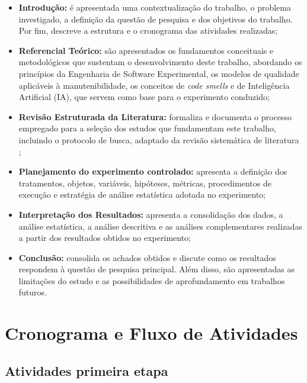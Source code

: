 \begin{itemize}[itemsep=0.4em, topsep=0.5em, parsep=0pt, partopsep=0pt]
	\item \textbf{Introdução:} é apresentada uma contextualização do trabalho, o problema investigado, a definição da questão de pesquisa e dos objetivos do trabalho. Por fim, descreve a estrutura e o cronograma das atividades realizadas;

	\item \textbf{Referencial Teórico:} são apresentados os fundamentos conceituais e metodológicos que sustentam o desenvolvimento deste trabalho, abordando os princípios da Engenharia de Software Experimental, os modelos de qualidade aplicáveis à manutenibilidade, os conceitos de \textit{code smells} e de Inteligência Artificial (IA), que servem como base para o experimento conduzido;

	\item \textbf{Revisão Estruturada da Literatura:} formaliza e documenta o processo empregado para a seleção dos estudos que fundamentam este trabalho, incluindo o protocolo de busca, adaptado da revisão sistemática de literatura \cite{kitchenham2007guidelines};

	\item \textbf{Planejamento do experimento controlado:} apresenta a definição dos tratamentos, objetos, variáveis, hipóteses, métricas, procedimentos de execução e estratégia de análise estatística adotada no experimento;

	\item \textbf{Interpretação dos Resultados:} apresenta a consolidação dos dados, a análise estatística, a análise descritiva e as análises complementares realizadas a partir dos resultados obtidos no experimento;

	\item \textbf{Conclusão:} consolida os achados obtidos e discute como os resultados respondem à questão de pesquisa principal. Além disso, são apresentadas as limitações do estudo e as possibilidades de aprofundamento em trabalhos futuros.
\end{itemize} 

\section{Cronograma e Fluxo de Atividades}
\label{sec:atividades-primeira-etapa}
\subsection{Atividades primeira etapa}


